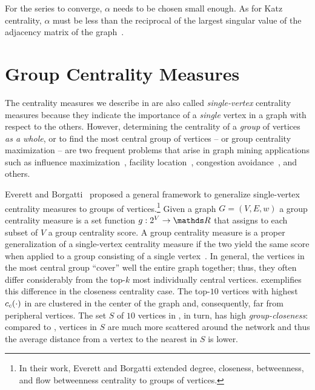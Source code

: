 For the series to converge, $\alpha$ needs to be chosen small enough.
As for Katz centrality, $\alpha$ must be less than the reciprocal of the
largest singular value of the adjacency matrix of the graph~\cite[Sec.
2.2]{DBLP:conf/alenex/AngrimanGBZGM20}.

\section{Group Centrality Measures}
\label{sec:group-centrality-measures}

The centrality measures we describe in  are
also called \emph{single-vertex} centrality measures because they indicate
the importance of a \emph{single} vertex in a graph with respect to the others.
However, determining the centrality of a \emph{group} of vertices \emph{as a whole},
or to find the most central group of vertices -- or group centrality
maximization -- are two frequent problems that arise in graph mining applications
such as influence
maximization~\cite{DBLP:journals/toc/KempeKT15,DBLP:journals/isci/ZhaoWLTG17},
facility
location~\cite{DBLP:journals/pe/GkantsidisMS06,DBLP:conf/icde/LiLCCDZ15},
congestion avoidance~\cite{yan2006efficient}, and others.

Everett and Borgatti~\cite{everett1999centrality} proposed a general
framework to generalize single-vertex centrality measures to groups of
vertices.\footnote{In their work, Everett and Borgatti extended degree,
closeness, betweenness, and flow betweenness centrality to groups of
vertices.} Given a graph $G = (V, E, w)$ a group
centrality measure is a set function $g :
2^V \to \real$ that assigns to each subset of $V$ a group
centrality score. A group centrality measure is a proper
generalization of a single-vertex centrality measure if the two yield the same
score when applied to a group consisting of a single
vertex~\cite{everett1999centrality}.
In general, the vertices in the most central group
\enquote{cover} well the entire graph together; thus, they
often differ considerably from the top-$k$ most individually
central vertices.  exemplifies this difference
in the closeness centrality case.
The top-$10$ vertices with highest $c_c(\cdot)$ in 
are clustered in the center of the graph and, consequently, far from peripheral
vertices. The set $S$ of $10$ vertices in , in turn,
has high \emph{group-closeness}: compared to ,
vertices in $S$ are much more scattered around the network and thus the
average distance from a vertex to the nearest in $S$ is lower.

